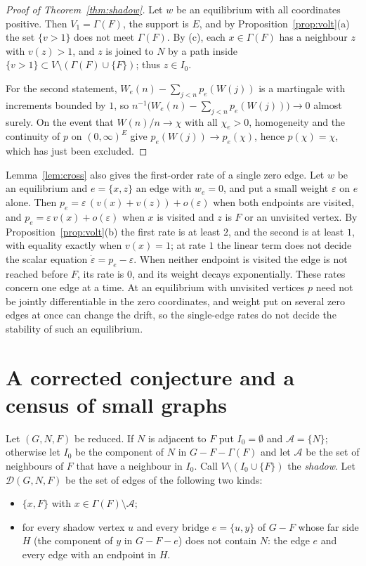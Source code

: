 \documentclass[11pt]{amsart}
\theoremstyle{remark}
\begin{document}
\begin{proof}[Proof of Theorem~\ref{thm:shadow}]
Let $w$ be an equilibrium with all coordinates positive. Then $V_1=\Gamma(F)$, the support is $E$, and by
Proposition~\ref{prop:volt}(a) the set $\{v>1\}$ does not meet $\Gamma(F)$. By (c), each $x\in \Gamma(F)$ has a neighbour $z$
with $v(z)>1$, and $z$ is joined to $N$ by a path inside $\{v>1\}\subset V\setminus(\Gamma(F)\cup\{F\})$; thus $z\in I_0$.

For the second statement, $W_e(n)-\sum_{j<n}p_e(W(j))$ is a martingale with increments bounded by $1$, so
$n^{-1}\bigl(W_e(n)-\sum_{j<n}p_e(W(j))\bigr)\to0$ almost surely. On the event that $W(n)/n\to\chi$ with all
$\chi_e>0$, homogeneity and the continuity of $p$ on $(0,\infty)^E$ give $p_e(W(j))\to p_e(\chi)$, hence
$p(\chi)=\chi$, which has just been excluded.
\end{proof}

Lemma~\ref{lem:cross} also gives the first-order rate of a single zero edge. Let $w$ be an equilibrium and
$e=\{x,z\}$ an edge with $w_e=0$, and put a small weight $\varepsilon$ on $e$ alone. Then
$p_e=\varepsilon\,(v(x)+v(z))+o(\varepsilon)$ when both endpoints are visited, and $p_e=\varepsilon\,v(x)+o(\varepsilon)$
when $x$ is visited and $z$ is $F$ or an unvisited vertex. By Proposition~\ref{prop:volt}(b) the first rate is at
least $2$, and the second is at least $1$, with equality exactly when $v(x)=1$; at rate $1$ the linear term does not
decide the scalar equation $\dot\varepsilon=p_e-\varepsilon$. When neither endpoint is visited the edge is not reached
before $F$, its rate is $0$, and its weight decays exponentially. These rates concern one edge at a time. At an
equilibrium with unvisited vertices $p$ need not be jointly differentiable in the zero coordinates, and weight put on
several zero edges at once can change the drift, so the single-edge rates do not decide the stability of such an
equilibrium.

\section{A corrected conjecture and a census of small graphs}\label{sec:census}

Let $(G,N,F)$ be reduced. If $N$ is adjacent to $F$ put $I_0=\emptyset$ and $\mathcal A=\{N\}$; otherwise let $I_0$ be the
component of $N$ in $G-F-\Gamma(F)$ and let $\mathcal A$ be the set of neighbours of $F$ that have a neighbour in $I_0$. Call
$V\setminus(I_0\cup\{F\})$ the \emph{shadow}. Let $\mathcal D(G,N,F)$ be the set of edges of the following two kinds:
\begin{itemize}
\item[(D1)] $\{x,F\}$ with $x\in \Gamma(F)\setminus\mathcal A$;
\item[(D2)] for every shadow vertex $u$ and every bridge $e=\{u,y\}$ of $G-F$ whose far side $H$ (the component of $y$
in $G-F-e$) does not contain $N$: the edge $e$ and every edge with an endpoint in $H$.
\end{itemize}
\end{document}
